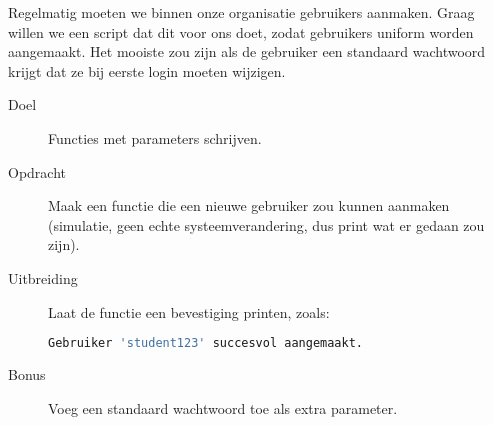 Regelmatig moeten we binnen onze organisatie gebruikers aanmaken. Graag willen we een script dat dit voor ons doet, zodat gebruikers uniform worden aangemaakt. Het mooiste zou zijn als de gebruiker een standaard wachtwoord krijgt dat ze bij eerste login moeten wijzigen.
\begin{description}
\item[Doel] Functies met parameters schrijven.
\item[Opdracht] Maak een functie  die een nieuwe gebruiker zou kunnen aanmaken (simulatie, geen echte systeemverandering, dus print wat er gedaan zou zijn).
\item[Uitbreiding] Laat de functie een bevestiging printen, zoals:

\begin{lstlisting}[language=python]
Gebruiker 'student123' succesvol aangemaakt.
\end{lstlisting}

\item[Bonus] Voeg een standaard wachtwoord toe als extra parameter.
\end{description}

